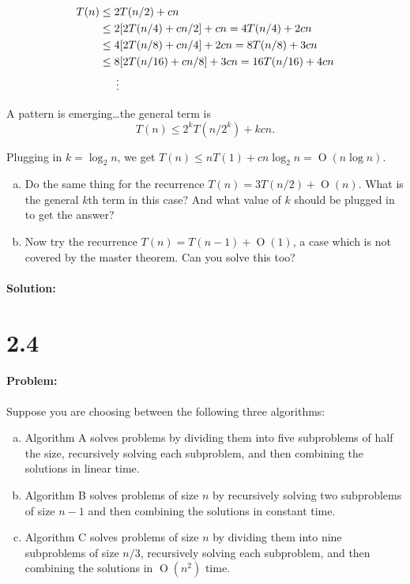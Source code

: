 \documentclass[12pt]{article}
\newcommand{\BigO}[1]{\ensuremath{\operatorname{O}\left(#1\right)}}
\begin{document}
\begin{align*}
T (n) &\leq 2T (n/2) + cn \\
&\leq 2[2T(n/4) + cn/2] + cn = 4T(n/4) + 2cn \\
&\leq 4[2T(n/8) + cn/4] + 2cn = 8T(n/8) + 3cn \\
&\leq 8[2T(n/16) + cn/8] + 3cn = 16T(n/16) + 4cn \\
&\indent \vdots
\end{align*}

A pattern is emerging\ldots the general term is 
\[T(n) \leq 2^kT(n/2^k) + kcn.\]

Plugging in $k = \log_2{n}$, we get $T(n) \leq nT(1) + cn\log_2{n} = \BigO{n\log{n}}.$

\begin{enumerate}[(a)]
\item Do the same thing for the recurrence $T(n) = 3T(n/2) + \BigO{n}$. What
is the general $k$th term
in this case? And what value of $k$ should be plugged in to get the
answer?

\item Now try the recurrence $T(n) = T( n −1 ) + \BigO{1}$, a case which is not
covered by the master theorem. Can you solve this too?
\end{enumerate}

\paragraph{Solution:}

\section*{2.4}
\paragraph{Problem:}
Suppose you are choosing between the following three algorithms:

\begin{enumerate}[(a)]
\item Algorithm A solves problems by dividing them into five subproblems
of half the size, recursively solving each subproblem, and then
combining the solutions in linear time.

\item Algorithm B solves problems of size $n$ by recursively solving two
subproblems of size $n−1$ and then combining the solutions in constant
time.

\item Algorithm C solves problems of size $n$ by dividing them into nine
subproblems of size $n/3$, recursively solving each subproblem, and then
combining the solutions in $\BigO{n^2}$ time.
\end{enumerate}
\end{document}
